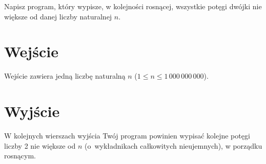 \documentclass{spiral-kurs}
\begin{document}
\makeheader
%
    Napisz program, który wypisze, w kolejności rosnącej, wszystkie
    potęgi dwójki nie większe od danej liczby naturalnej $n$.

    \section{Wejście}
    Wejście zawiera jedną liczbę naturalną $n$
    ($1 \le n \le 1\,000\,000\,000$).

    \section{Wyjście}
    W kolejnych wierszach wyjścia Twój program powinien wypisać kolejne
    potęgi liczby 2 nie większe od $n$ (o~wykładnikach całkowitych nieujemnych),
    w porządku rosnącym.



  
\end{document}
